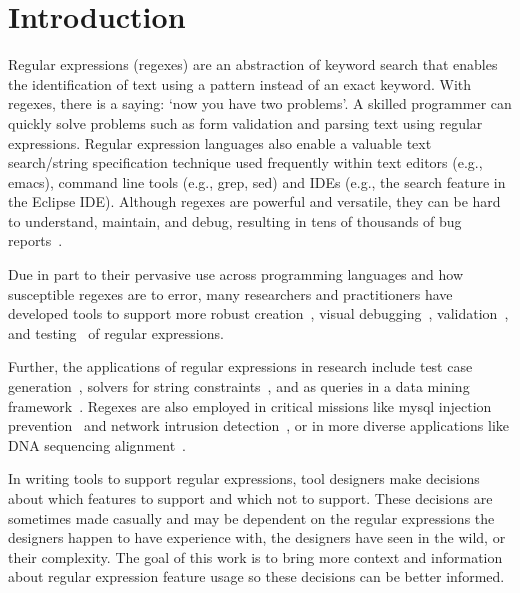 \section{Introduction }

Regular expressions (regexes) are an abstraction of keyword search that enables the identification of text using a pattern instead of an exact keyword.  
With regexes, there is a  saying: `now you have two problems'.
A skilled programmer can quickly solve problems such as form validation and parsing text using regular expressions.  Regular expression languages also enable a valuable text search/string specification technique used frequently within text editors (e.g., emacs), command line tools (e.g., grep, sed) and IDEs (e.g., the search feature in the Eclipse IDE).  Although regexes are powerful and versatile, they can be hard to understand,  maintain, and debug, resulting in tens of thousands of bug reports~\cite{Spishak:2012:TSR:2318202.2318207}.

Due in part to their pervasive use across programming languages and how susceptible regexes are to error, many researchers and practitioners have developed tools to support more robust creation~\cite{Spishak:2012:TSR:2318202.2318207}, visual debugging~\cite{Beck:2014:RVD:2591062.2591111},  validation~\cite{}, and testing~\cite{} of regular expressions.

Further, the applications of regular expressions in research include test case generation~\cite{Ghosh:2013:JAT:2486788.2486925, Galler:2014:STD:2683035.2683100},  solvers for string constraints~\cite{Trinh:2014:SSS:2660267.2660372, hampi}, and as queries in a data mining framework~\cite{Begel:2010:CDE:1806799.1806821}.
Regexes are also employed in critical missions like mysql injection prevention~\cite{Yeole:2011:ADT:1980022.1980229} and network intrusion detection~\cite{network}, or in more diverse applications like DNA sequencing alignment~\cite{1594922}. 

In writing tools to support regular expressions, tool designers make decisions about which features to support and which not to support. These decisions are sometimes made casually and may be dependent on the regular expressions the designers happen to have experience with, the designers have seen in the wild, or their complexity. The goal of this work is to bring more context and information about regular expression feature usage so these decisions can be better informed.

